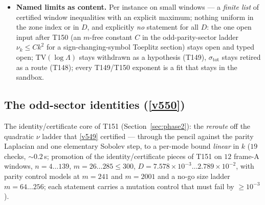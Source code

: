 \documentclass[11pt,a4paper]{article}
\begin{document}
\begin{itemize}[leftmargin=1.5em]
(max deviation $3.0\times10^{-5}$), so the ladder form $\nu_k\le Ck^2$ is the right question
and $\pi$ its exact floor; on every window, in the const gauge ($\varphi=\psi$ exactly ---
the ladder of the \emph{pure} Toeplitz-minus-Hankel section, no multiplier, no arithmetic
weight), the parity coefficient licence holds, $\nu^P_k\le Ck^2$ with the per-window certified
constant $C=11.70$--$17.28$, and the derived per-mode ceiling
$m\|\psi_k\|_\infty^2\le2(2\sqrt Ck+1)^2$ is a certified instance inequality --- an
$m$-free $C$ is exactly the one open input and is \emph{not} claimed. Controls: the ladder
$\times10^{-3}$ fails everywhere, a one-index calibration shift misses by $0.75$.
\item \textbf{Named limits as content.} Per instance on small windows --- a \emph{finite list}
of certified window inequalities with an explicit maximum; nothing uniform in the zone index
or in $D$, and explicitly \emph{no} statement for all $D$: the one open input after T150 (an
$m$-free constant $C$ in the odd-parity-sector ladder $\nu_k\le Ck^2$ for a
sign-changing-symbol Toeplitz section) stays open and typed open;
$\mathrm{TV}(\log\Lambda)$ stays withdrawn as a hypothesis (T149),
$\sigma_{\mathrm{tot}}$ stays retired as a route (T148); every T149/T150 exponent is a fit
that stays in the sandbox.
\end{itemize}

\subsection{The odd-sector identities (\texorpdfstring{\vref{v550}}{v550})}\label{sec:v550}
The identity/certificate core of T151 (Section~\ref{sec:phase2}): the \emph{reroute} off the
quadratic $\nu$ ladder that \vref{v549} certified --- through the pencil against the parity
Laplacian and one elementary Sobolev step, to a per-mode bound \emph{linear} in $k$
 ($19$ checks, ${\sim}0.2$\,s; promotion of the
identity/certificate pieces of T151 on $12$ frame-A windows, $n=4\ldots139$,
$m=26\ldots285\le300$, $D=7.578\times10^{-3}\ldots2.789\times10^{-2}$, with parity control
models at $m=241$ and $m=2001$ and a no-go size ladder $m=64\ldots256$; each statement carries
a mutation control that must fail by $\ge10^{-3}$).
\end{document}
